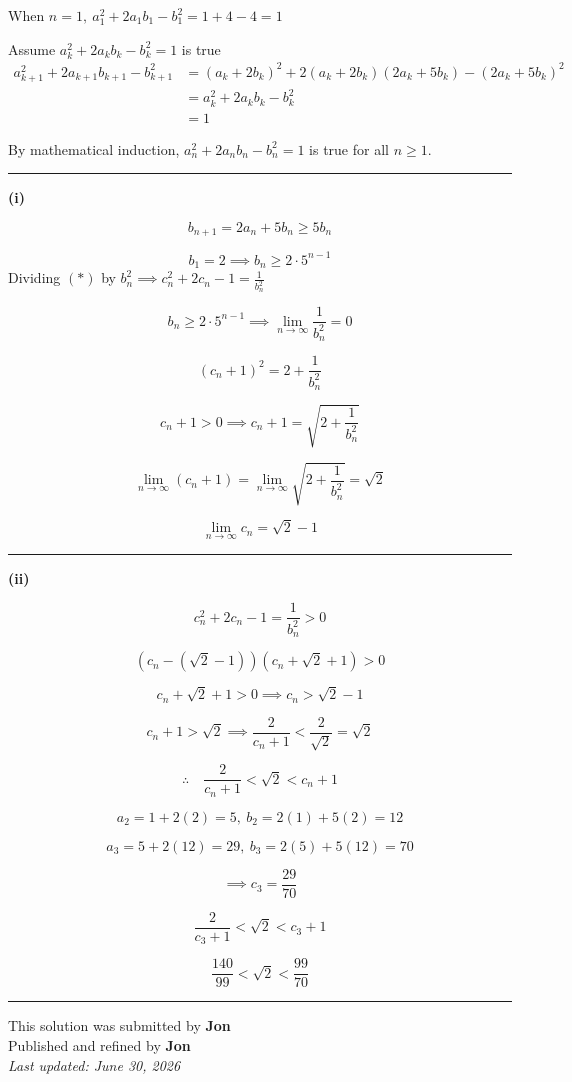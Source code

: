 \documentclass[12pt]{article}
\begin{document}
\newcommand{\ds}{\displaystyle}
When $\ds n=1,\ a_1^2+2a_1b_1-b_1^2=1+4-4=1$

Assume $\ds a_k^2+2a_kb_k-b_k^2=1$ is true
\begin{align*}
a_{k+1}^2+2a_{k+1}b_{k+1}-b_{k+1}^2
&=(a_k+2b_k)^2+2(a_k+2b_k)(2a_k+5b_k)-(2a_k+5b_k)^2\\
&=a_k^2+2a_kb_k-b_k^2\\
&=1
\end{align*}

By mathematical induction, $\ds a_n^2+2a_nb_n-b_n^2=1$ is true for all $n\geq 1$.

\bigskip\hrule\bigskip

\textbf{(i)}

$$b_{n+1}=2a_n+5b_n\geq 5b_n$$

$$b_1=2\implies b_n\geq 2\cdot 5^{n-1}$$
Dividing $(*)$ by $\ds b_n^2\implies c_n^2+2c_n-1=\frac1{b_n^2}$

$$b_n\geq 2\cdot 5^{n-1}\implies \lim_{n\to\infty}\frac1{b_n^2}=0$$

$$(c_n+1)^2=2+\frac1{b_n^2}$$

$$c_n+1>0\implies c_n+1=\sqrt{2+\frac1{b_n^2}}$$

$$\lim_{n\to\infty}(c_n+1)
=\lim_{n\to\infty}\sqrt{2+\frac1{b_n^2}}
=\sqrt2$$

$$\lim_{n\to\infty}c_n=\sqrt2-1$$

\bigskip\hrule\bigskip

\textbf{(ii)}

$$c_n^2+2c_n-1=\frac1{b_n^2}>0$$

$$(c_n-(\sqrt2-1))(c_n+\sqrt2+1)>0$$

$$c_n+\sqrt2+1>0\implies c_n>\sqrt2-1$$

$$c_n+1>\sqrt2 \implies \frac2{c_n+1}<\frac2{\sqrt2}=\sqrt2$$

$$\therefore\quad \frac2{c_n+1}<\sqrt2<c_n+1$$


$$a_2=1+2(2)=5,\  b_2=2(1)+5(2)=12$$

$$a_3=5+2(12)=29,\  b_3=2(5)+5(12)=70$$

$$\implies c_3=\frac{29}{70}$$

$$\frac2{c_3+1}<\sqrt2<c_3+1$$

$$\frac{140}{99}<\sqrt2<\frac{99}{70}$$

\bigskip
\hrule
\begin{center}
    This solution was submitted by \textbf{Jon}\\[4pt]
    Published and refined by \textbf{Jon}\\[8pt]
    \textit{Last updated: June 30, 2026}
\end{center}
\end{document}
